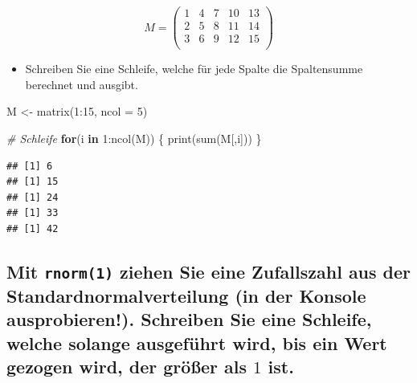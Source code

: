\documentclass[12pt,a4paper]{article}
\newenvironment{Shaded}{\begin{snugshade}}{\end{snugshade}}
\newcommand{\AttributeTok}[1]{\textcolor[rgb]{0.77,0.63,0.00}{#1}}
\newcommand{\CommentTok}[1]{\textcolor[rgb]{0.56,0.35,0.01}{\textit{#1}}}
\newcommand{\ControlFlowTok}[1]{\textcolor[rgb]{0.13,0.29,0.53}{\textbf{#1}}}
\newcommand{\DecValTok}[1]{\textcolor[rgb]{0.00,0.00,0.81}{#1}}
\newcommand{\FunctionTok}[1]{\textcolor[rgb]{0.00,0.00,0.00}{#1}}
\newcommand{\NormalTok}[1]{#1}
\newcommand{\OtherTok}[1]{\textcolor[rgb]{0.56,0.35,0.01}{#1}}
\newcommand{\SpecialCharTok}[1]{\textcolor[rgb]{0.00,0.00,0.00}{#1}}
\begin{document}
\[
M=\begin{pmatrix}
1 & 4 & 7 & 10 & 13\\
2 & 5 & 8 & 11 & 14\\
3 & 6 & 9 & 12 & 15\\
\end{pmatrix}
\]

\begin{itemize}
  \item Schreiben Sie eine Schleife, welche für jede Spalte die Spaltensumme berechnet und ausgibt.
\end{itemize}

\begin{Shaded}
\begin{Highlighting}[]
\NormalTok{    M }\OtherTok{\textless{}{-}} \FunctionTok{matrix}\NormalTok{(}\DecValTok{1}\SpecialCharTok{:}\DecValTok{15}\NormalTok{, }\AttributeTok{ncol =} \DecValTok{5}\NormalTok{)}
    
    \CommentTok{\# Schleife}
    \ControlFlowTok{for}\NormalTok{(i }\ControlFlowTok{in} \DecValTok{1}\SpecialCharTok{:}\FunctionTok{ncol}\NormalTok{(M)) \{}
      \FunctionTok{print}\NormalTok{(}\FunctionTok{sum}\NormalTok{(M[,i]))}
\NormalTok{    \}}
\end{Highlighting}
\end{Shaded}

\begin{verbatim}
## [1] 6
## [1] 15
## [1] 24
## [1] 33
## [1] 42
\end{verbatim}

\hypertarget{mit-ziehen-sie-eine-zufallszahl-aus-der-standardnormalverteilung-in-der-konsole-ausprobieren.-schreiben-sie-eine-schleife-welche-solange-ausgefuxfchrt-wird-bis-ein-wert-gezogen-wird-der-gruxf6uxdfer-als-1-ist.}{%
\subsection{\texorpdfstring{Mit \texttt{rnorm(1)} ziehen Sie eine
Zufallszahl aus der Standardnormalverteilung (in der Konsole
ausprobieren!). Schreiben Sie eine Schleife, welche solange ausgeführt
wird, bis ein Wert gezogen wird, der größer als \(1\)
ist.}{Mit  ziehen Sie eine Zufallszahl aus der Standardnormalverteilung (in der Konsole ausprobieren!). Schreiben Sie eine Schleife, welche solange ausgeführt wird, bis ein Wert gezogen wird, der größer als 1 ist.}}\label{mit-ziehen-sie-eine-zufallszahl-aus-der-standardnormalverteilung-in-der-konsole-ausprobieren.-schreiben-sie-eine-schleife-welche-solange-ausgefuxfchrt-wird-bis-ein-wert-gezogen-wird-der-gruxf6uxdfer-als-1-ist.}}
\end{document}
